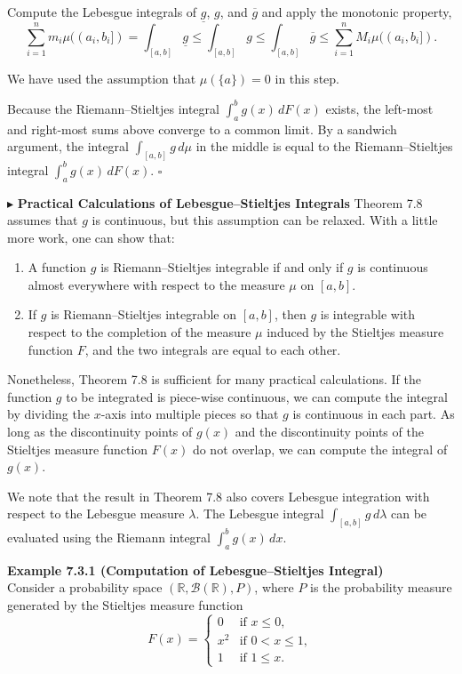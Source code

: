 Compute the Lebesgue integrals of $\underline{g}$, $g$, and $\overline{g}$ and apply the monotonic property,
\[
\sum_{i=1}^{n} m_i \mu((a_i,b_i])
=
\int_{[a,b]} \underline{g}
\le
\int_{[a,b]} g
\le
\int_{[a,b]} \overline{g}
\le
\sum_{i=1}^{n} M_i \mu((a_i,b_i]).
\]

We have used the assumption that $\mu(\{a\})=0$ in this step.

Because the Riemann--Stieltjes integral $\int_a^b g(x)\, dF(x)$ exists, the left-most and right-most sums above converge to a common limit. By a sandwich argument, the integral $\int_{[a,b]} g\, d\mu$ in the middle is equal to the Riemann--Stieltjes integral $\int_a^b g(x)\, dF(x)$. \hfill $\square$

\noindent$\blacktriangleright$ \textbf{Practical Calculations of Lebesgue--Stieltjes Integrals} Theorem 7.8 assumes that $g$ is continuous, but this assumption can be relaxed. With a little more work, one can show that:
\begin{enumerate}[label=(\alph*)]
    \item A function $g$ is Riemann--Stieltjes integrable if and only if $g$ is continuous almost everywhere with respect to the measure $\mu$ on $[a,b]$.
    \item If $g$ is Riemann--Stieltjes integrable on $[a,b]$, then $g$ is integrable with respect to the completion of the measure $\mu$ induced by the Stieltjes measure function $F$, and the two integrals are equal to each other.
\end{enumerate}

Nonetheless, Theorem 7.8 is sufficient for many practical calculations. If the function $g$ to be integrated is piece-wise continuous, we can compute the integral by dividing the $x$-axis into multiple pieces so that $g$ is continuous in each part. As long as the discontinuity points of $g(x)$ and the discontinuity points of the Stieltjes measure function $F(x)$ do not overlap, we can compute the integral of $g(x)$.

We note that the result in Theorem 7.8 also covers Lebesgue integration with respect to the Lebesgue measure $\lambda$. The Lebesgue integral $\int_{[a,b]} g\, d\lambda$ can be evaluated using the Riemann integral $\int_a^b g(x)\, dx$.

\textbf{Example 7.3.1 (Computation of Lebesgue--Stieltjes Integral)} \\
Consider a probability space $(\mathbb{R},\mathcal{B}(\mathbb{R}),P)$, where $P$ is the probability measure generated by the Stieltjes measure function
\[
F(x)=
\begin{cases}
0 & \text{if } x\le 0,\\
x^2 & \text{if } 0<x\le 1,\\
1 & \text{if } 1\le x.
\end{cases}
\]


